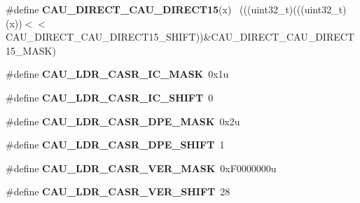 \begin{DoxyCompactItemize}
\item 
\hypertarget{group___c_a_u___register___masks_gae5cea3578099cacc02293d8056fbbb04}{}\#define {\bfseries C\+A\+U\+\_\+\+D\+I\+R\+E\+C\+T\+\_\+\+C\+A\+U\+\_\+\+D\+I\+R\+E\+C\+T15}(x)                          ~(((uint32\+\_\+t)(((uint32\+\_\+t)(x))$<$$<$C\+A\+U\+\_\+\+D\+I\+R\+E\+C\+T\+\_\+\+C\+A\+U\+\_\+\+D\+I\+R\+E\+C\+T15\+\_\+\+S\+H\+I\+F\+T))\&C\+A\+U\+\_\+\+D\+I\+R\+E\+C\+T\+\_\+\+C\+A\+U\+\_\+\+D\+I\+R\+E\+C\+T15\+\_\+\+M\+A\+S\+K)\label{group___c_a_u___register___masks_gae5cea3578099cacc02293d8056fbbb04}

\item 
\hypertarget{group___c_a_u___register___masks_gae9945a982ee40a35ec7c92d32fd9956a}{}\#define {\bfseries C\+A\+U\+\_\+\+L\+D\+R\+\_\+\+C\+A\+S\+R\+\_\+\+I\+C\+\_\+\+M\+A\+S\+K}~0x1u\label{group___c_a_u___register___masks_gae9945a982ee40a35ec7c92d32fd9956a}

\item 
\hypertarget{group___c_a_u___register___masks_ga262e6d420bd6efa036c7c6f8a3431c46}{}\#define {\bfseries C\+A\+U\+\_\+\+L\+D\+R\+\_\+\+C\+A\+S\+R\+\_\+\+I\+C\+\_\+\+S\+H\+I\+F\+T}~0\label{group___c_a_u___register___masks_ga262e6d420bd6efa036c7c6f8a3431c46}

\item 
\hypertarget{group___c_a_u___register___masks_ga591913fd850627ba4dbbe23dff834f4e}{}\#define {\bfseries C\+A\+U\+\_\+\+L\+D\+R\+\_\+\+C\+A\+S\+R\+\_\+\+D\+P\+E\+\_\+\+M\+A\+S\+K}~0x2u\label{group___c_a_u___register___masks_ga591913fd850627ba4dbbe23dff834f4e}

\item 
\hypertarget{group___c_a_u___register___masks_gab1825cdea4d35d62af51b40a80524a61}{}\#define {\bfseries C\+A\+U\+\_\+\+L\+D\+R\+\_\+\+C\+A\+S\+R\+\_\+\+D\+P\+E\+\_\+\+S\+H\+I\+F\+T}~1\label{group___c_a_u___register___masks_gab1825cdea4d35d62af51b40a80524a61}

\item 
\hypertarget{group___c_a_u___register___masks_gac3ea78b4eacaf7b3cf614dee61564e86}{}\#define {\bfseries C\+A\+U\+\_\+\+L\+D\+R\+\_\+\+C\+A\+S\+R\+\_\+\+V\+E\+R\+\_\+\+M\+A\+S\+K}~0x\+F0000000u\label{group___c_a_u___register___masks_gac3ea78b4eacaf7b3cf614dee61564e86}

\item 
\hypertarget{group___c_a_u___register___masks_ga6c0cd608dfa284be126e88595cfef13c}{}\#define {\bfseries C\+A\+U\+\_\+\+L\+D\+R\+\_\+\+C\+A\+S\+R\+\_\+\+V\+E\+R\+\_\+\+S\+H\+I\+F\+T}~28\label{group___c_a_u___register___masks_ga6c0cd608dfa284be126e88595cfef13c}


\end{DoxyCompactItemize}
